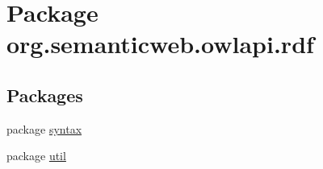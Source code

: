 \hypertarget{namespaceorg_1_1semanticweb_1_1owlapi_1_1rdf}{\section{Package org.\-semanticweb.\-owlapi.\-rdf}
\label{namespaceorg_1_1semanticweb_1_1owlapi_1_1rdf}
}
\subsection*{Packages}
\begin{DoxyCompactItemize}
\item 
package \hyperlink{namespaceorg_1_1semanticweb_1_1owlapi_1_1rdf_1_1syntax}{syntax}
\item 
package \hyperlink{namespaceorg_1_1semanticweb_1_1owlapi_1_1rdf_1_1util}{util}
\end{DoxyCompactItemize}
